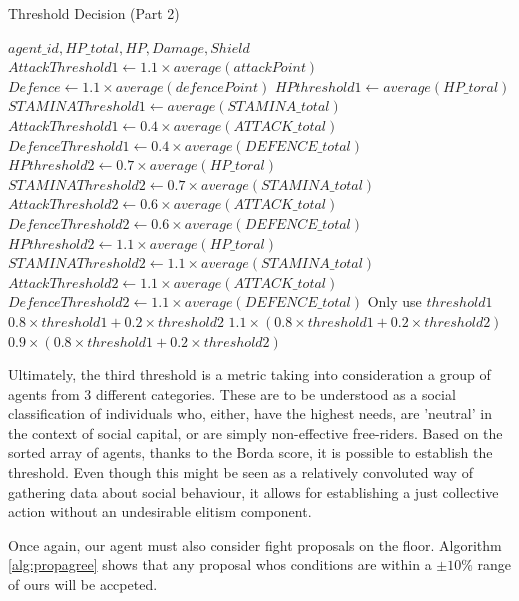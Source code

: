     
\begin{algorithm}[htb]
\caption{Threshold Decision (Part 2)}\label{alg:thresh2}
\begin{algorithmic} 
\scriptsize
\Require $agent\_id, HP\_total, HP, Damage, Shield$
\State $AttackThreshold1 \leftarrow 1.1 \times average(attackPoint)$
\State $Defence \leftarrow 1.1 \times average(defencePoint)$
\EndIf
{}
\State $HPthreshold1 \leftarrow average(HP\_toral)$
\State $STAMINAThreshold1 \leftarrow average(STAMINA\_total)$
\State $AttackThreshold1 \leftarrow 0.4 \times average(ATTACK\_total)$
\State $DefenceThreshold1 \leftarrow 0.4 \times average(DEFENCE\_total)$
\EndIf
{}
\State $HPthreshold2 \leftarrow 0.7 \times average(HP\_toral)$
\State $STAMINAThreshold2 \leftarrow 0.7 \times average(STAMINA\_total)$
\State $AttackThreshold2 \leftarrow 0.6 \times average(ATTACK\_total)$
\State $DefenceThreshold2 \leftarrow 0.6 \times average(DEFENCE\_total)$
\EndIf
{}
\State $HPthreshold2 \leftarrow 1.1 \times average(HP\_toral)$
\State $STAMINAThreshold2 \leftarrow 1.1 \times average(STAMINA\_total)$
\State $AttackThreshold2 \leftarrow 1.1 \times average(ATTACK\_total)$
\State $DefenceThreshold2 \leftarrow 1.1 \times average(DEFENCE\_total)$
\EndIf
{}
\State Only use $threshold1$
\EndIf
{}
\State $0.8\times threshold1 + 0.2 \times threshold2$
\EndIf
{}
\State $1.1 \times (0.8\times threshold1 + 0.2 \times threshold2)$
\EndIf
{}
\State $0.9 \times (0.8\times threshold1 + 0.2 \times threshold2)$
\EndIf
\end{algorithmic}
\end{algorithm}


Ultimately, the third threshold is a metric taking into consideration a group of agents from 3 different categories. These are to be understood as a social classification of individuals who, either, have the highest needs, are 'neutral' in the context of social capital, or are simply non-effective free-riders. Based on the sorted array of agents, thanks to the Borda score, it is possible to establish the threshold. Even though this might be seen as a relatively convoluted way of gathering data about social behaviour, it allows for establishing a just collective action without an undesirable elitism component.


Once again, our agent must also consider fight proposals on the floor. Algorithm \ref{alg:propagree} shows that any proposal whos conditions are within a $\pm 10\%$ range of ours will be accpeted. 

